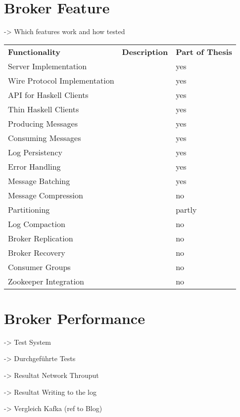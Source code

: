 \section{Broker Feature}
-> Which features work and how tested 

\begin{table}[h]
\begin{tabular}{lll}
\textbf{Functionality}       & \textbf{Description} & \textbf{Part of Thesis} \\
Server Implementation        &                      & yes                     \\
Wire Protocol Implementation &                      & yes                     \\
API for Haskell Clients      &                      & yes                     \\
Thin Haskell Clients         &                      & yes                     \\
Producing Messages           &                      & yes                     \\
Consuming Messages           &                      & yes                     \\
Log Persistency              &                      & yes                     \\
Error Handling               &                      & yes                     \\
Message Batching             &                      & yes                     \\
Message Compression          &                      & no                      \\
Partitioning                 &                      & partly                  \\
Log Compaction               &                      & no                      \\
Broker Replication           &                      & no                      \\
Broker Recovery              &                      & no                      \\
Consumer Groups              &                      & no                      \\
Zookeeper Integration        &                      & no                     
\end{tabular}
\end{table}

\section{Broker Performance}
-> Test System

-> Durchgeführte Tests 

-> Resultat Network Throuput 

-> Resultat Writing to the log 

-> Vergleich Kafka (ref to Blog) 


